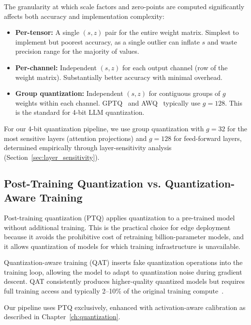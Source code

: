\documentclass[12pt, letterpaper, twoside]{report}
\begin{document}
The granularity at which scale factors and zero-points are computed significantly affects both accuracy and implementation complexity:

\begin{itemize}[itemsep=1pt, topsep=2pt, parsep=0pt]
\item \textbf{Per-tensor:} A single $(s, z)$ pair for the entire weight matrix. Simplest to implement but poorest accuracy, as a single outlier can inflate $s$ and waste precision range for the majority of values.
\item \textbf{Per-channel:} Independent $(s, z)$ for each output channel (row of the weight matrix). Substantially better accuracy with minimal overhead.
\item \textbf{Group quantization:} Independent $(s, z)$ for contiguous groups of $g$ weights within each channel. GPTQ~\cite{frantar2022gptq} and AWQ~\cite{lin2024awq} typically use $g = 128$. This is the standard for 4-bit LLM quantization.
\end{itemize}

For our 4-bit quantization pipeline, we use group quantization with $g = 32$ for the most sensitive layers (attention projections) and $g = 128$ for feed-forward layers, determined empirically through layer-sensitivity analysis (Section~\ref{sec:layer_sensitivity}).

\subsection{Post-Training Quantization vs. Quantization-Aware Training}
\label{subsec:ptq_qat}

Post-training quantization (PTQ) applies quantization to a pre-trained model without additional training. This is the practical choice for edge deployment because it avoids the prohibitive cost of retraining billion-parameter models, and it allows quantization of models for which training infrastructure is unavailable.

Quantization-aware training (QAT) inserts fake quantization operations into the training loop, allowing the model to adapt to quantization noise during gradient descent. QAT consistently produces higher-quality quantized models but requires full training access and typically 2--10\% of the original training compute~\cite{nagel2021white}.

Our pipeline uses PTQ exclusively, enhanced with activation-aware calibration as described in Chapter~\ref{ch:quantization}.
\end{document}
